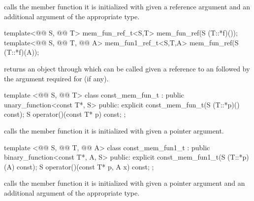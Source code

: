 \documentclass[american,twoside]{book}
\begin{document}
\begin{itemdescr}
\pnum
{} calls the member function it is initialized with
given a reference argument and an additional argument of the appropriate type.
\end{itemdescr}

%
\begin{itemdecl}
template<@@ S, @@ T> mem_fun_ref_t<S,T>
   mem_fun_ref(S (T::*f)());
template<@@ S, @@ T, @@ A> mem_fun1_ref_t<S,T,A>
   mem_fun_ref(S (T::*f)(A));
\end{itemdecl}

\begin{itemdescr}
\pnum
{} returns an object through which 
can be called given a reference to an  followed by the argument
required for  (if any).
\end{itemdescr}

%
\begin{itemdecl}
template <@@ S, @@ T> class const_mem_fun_t
      : public unary_function<const T*, S> {
public:
  explicit const_mem_fun_t(S (T::*p)() const);
  S operator()(const T* p) const;
};
\end{itemdecl}

\begin{itemdescr}
\pnum
{} calls the member function it is initialized with
given a pointer argument.
\end{itemdescr}

%
\begin{itemdecl}
template <@@ S, @@ T, @@ A> class const_mem_fun1_t
      : public binary_function<const T*, A, S> {
public:
  explicit const_mem_fun1_t(S (T::*p)(A) const);
  S operator()(const T* p, A x) const;
};
\end{itemdecl}

\begin{itemdescr}
\pnum
{} calls the member function it is initialized with
given a pointer argument and an additional argument of the appropriate type.
\end{itemdescr}
\end{document}
